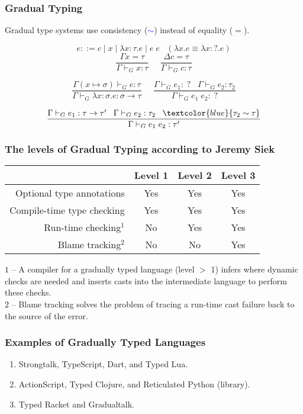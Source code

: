 \documentclass{beamer}
\begin{document}
\begin{frame}
\frametitle{Gradual Typing}
Gradual type systems use consistency (\textcolor{blue}{$\sim$}) instead of equality ($=$).
\begin{Large}
\[
e ::= c \;|\; x \;|\; \lambda x:\tau.e \;|\; e\;e \;\;\;
(\lambda x.e \equiv \lambda x:?.e)
\]
\[
\frac{\Gamma x = \tau}
     {\Gamma \vdash_{G} x:\tau} \;\;\;\;\;
\frac{\Delta c = \tau}
     {\Gamma \vdash_{G} c:\tau}
\]

\[
\frac{\Gamma(x \mapsto \sigma) \vdash_{G} e:\tau}
     {\Gamma \vdash_{G} \lambda x:\sigma.e:\sigma \rightarrow \tau} \;\;\;\;\;
\frac{\Gamma \vdash_{G} e_{1}:\;? \;\;\; \Gamma \vdash_{G} e_{2}:\tau_{2}}
     {\Gamma \vdash_{G} e_{1}\;e_{2}:\;?}
\]

\[
\frac{\Gamma \vdash_{G} e_{1}:\tau \rightarrow \tau' \;\;\;
      \Gamma \vdash_{G} e_{2}:\tau_{2} \;\;\; \textcolor{blue}{\tau_{2} \sim \tau}}
     {\Gamma \vdash_{G} e_{1}\;e_{2}:\tau'}
\]
\end{Large}
\end{frame}

\begin{frame}
\frametitle{The levels of Gradual Typing according to Jeremy Siek}
\begin{center}
\begin{tabular}{|r|c|c|c|}
\hline
& Level 1 & Level 2 & Level 3\\
\hline
Optional type annotations & Yes & Yes & Yes \\ 
\hline
Compile-time type checking & Yes & Yes & Yes \\
\hline
Run-time checking$^{1}$ & No & Yes & Yes \\
\hline
Blame tracking$^{2}$ & No & No & Yes\\
\hline
\end{tabular}
\end{center}
$1$ -- A compiler for a gradually typed language (level $>$ 1) infers
where dynamic checks are needed and inserts casts into the intermediate
language to perform these checks.\\
$2$ -- Blame tracking solves the problem of tracing a run-time cast
failure back to the source of the error.
\end{frame}

\begin{frame}
\frametitle{Examples of Gradually Typed Languages}
\begin{enumerate}
\item Strongtalk, TypeScript, Dart, and Typed Lua.
\item ActionScript, Typed Clojure, and Reticulated Python (library).
\item Typed Racket and Gradualtalk.
\end{enumerate}
\end{frame}
\end{document}
